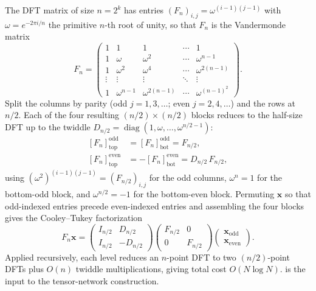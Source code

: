 \documentclass[a4paper, twocolumn]{quantumarticle}
\newcommand{\diag}{\operatorname{diag}}
\begin{document}
The DFT matrix of size $n = 2^k$ has entries $(F_n)_{i,j} = \omega^{(i-1)(j-1)}$ with $\omega = e^{-2\pi i / n}$ the primitive $n$-th root of unity, so that $F_n$ is the Vandermonde matrix
\begin{equation}
  F_n = \begin{pmatrix}
    1 & 1 & 1 & \cdots & 1 \\
    1 & \omega & \omega^2 & \cdots & \omega^{n-1} \\
    1 & \omega^2 & \omega^4 & \cdots & \omega^{2(n-1)} \\
    \vdots & \vdots & \vdots & \ddots & \vdots \\
    1 & \omega^{n-1} & \omega^{2(n-1)} & \cdots & \omega^{(n-1)^2}
  \end{pmatrix}.
  \label{eq:vandermonde}
\end{equation}
Split the columns by parity (odd $j = 1, 3, \ldots$; even $j = 2, 4, \ldots$) and the rows at $n/2$. Each of the four resulting $(n/2) \times (n/2)$ blocks reduces to the half-size DFT up to the twiddle $D_{n/2} = \diag(1, \omega, \ldots, \omega^{n/2-1})$:
\begin{equation}
  \begin{aligned}
    {[F_n]}^{\text{odd}}_{\text{top}} &= {[F_n]}^{\text{odd}}_{\text{bot}} = F_{n/2}, \\
    {[F_n]}^{\text{even}}_{\text{top}} &= -{[F_n]}^{\text{even}}_{\text{bot}} = D_{n/2}\, F_{n/2},
  \end{aligned}
  \label{eq:blocks}
\end{equation}
using $(\omega^2)^{(i-1)(j-1)} = (F_{n/2})_{i,j}$ for the odd columns, $\omega^n = 1$ for the bottom-odd block, and $\omega^{n/2} = -1$ for the bottom-even block.
Permuting $\mathbf{x}$ so that odd-indexed entries precede even-indexed entries and assembling the four blocks gives the Cooley--Tukey factorization
\begin{equation}
  F_n \mathbf{x}
  = \begin{pmatrix} I_{n/2} & D_{n/2} \\ I_{n/2} & -D_{n/2} \end{pmatrix}
    \begin{pmatrix} F_{n/2} & 0 \\ 0 & F_{n/2} \end{pmatrix}
    \begin{pmatrix} \mathbf{x}_{\text{odd}} \\ \mathbf{x}_{\text{even}} \end{pmatrix}.
  \label{eq:fft}
\end{equation}
Applied recursively, each level reduces an $n$-point DFT to two $(n/2)$-point DFTs plus $O(n)$ twiddle multiplications, giving total cost $O(N \log N)$.
 is the input to the tensor-network construction.
\end{document}

